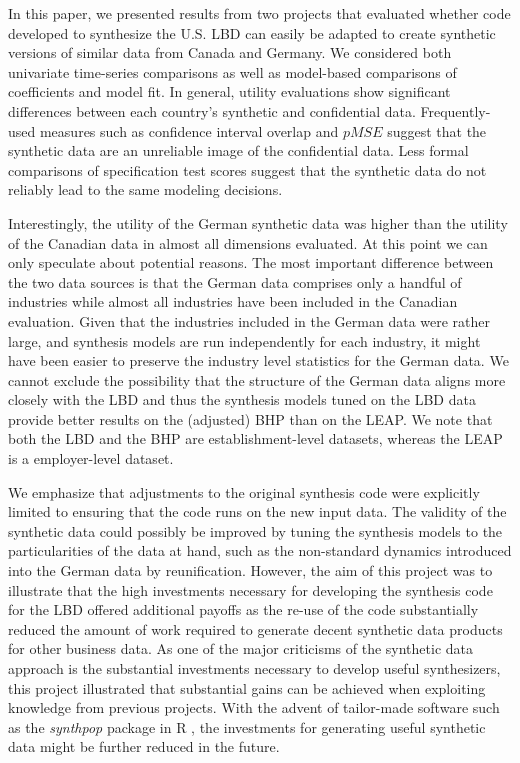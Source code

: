 
In this paper, we presented results from two projects that evaluated whether code developed to synthesize the U.S. LBD can easily be adapted to create synthetic versions of similar data from Canada and Germany. We considered both univariate time-series comparisons as well as model-based comparisons of coefficients and model fit. In general, utility evaluations show significant differences between each country's synthetic and confidential data. Frequently-used measures such as confidence interval overlap and $pMSE$ suggest that the synthetic data are an unreliable image of the confidential data. Less formal comparisons of specification test scores suggest that the synthetic data do not reliably lead to  the same modeling decisions.

Interestingly, the utility of the German synthetic data was higher than the utility of the Canadian data in almost all dimensions evaluated. At this point we can only speculate about potential reasons. The most important difference between the two data sources is that the German data comprises only a handful of industries while almost all industries have been included in the Canadian evaluation. Given that the industries included in the German data were rather large, and synthesis models are run independently for each industry, it might have been easier to preserve the industry level statistics for the German data. We cannot exclude the possibility that  the structure of the German data aligns more closely with the LBD and thus the synthesis models tuned on the LBD data provide better results on the (adjusted) BHP than on the LEAP. We note that both the LBD and the BHP are establishment-level datasets, whereas the LEAP is a employer-level dataset. 

We emphasize that adjustments to the original synthesis code were explicitly limited to ensuring that the code runs on the new input data. The validity of the synthetic data could possibly be improved by tuning the synthesis models to the particularities of the data at hand, such as the non-standard dynamics introduced into the German data by reunification.  However, the aim of this project was to illustrate that the high investments necessary for developing the synthesis code for the LBD offered additional payoffs as the re-use of the code substantially reduced the amount of work required to generate decent synthetic data products for other business data. As one of the major criticisms of the synthetic data approach is the substantial investments necessary to develop useful synthesizers, this project illustrated that substantial gains can be achieved when exploiting knowledge from previous projects. With the advent of tailor-made software such as the \textit{synthpop} package in R \citep{JSSv074i11}, the investments for generating useful synthetic data might be further reduced in the future.


